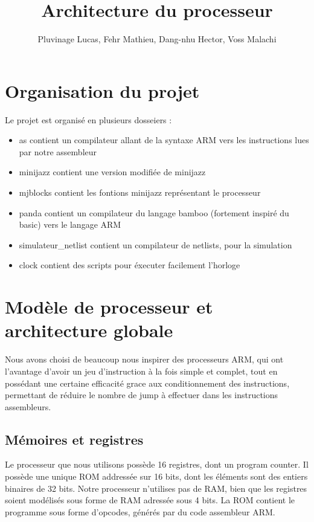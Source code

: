 \documentclass[a4paper]{article}
\title{Architecture du processeur}
\author{Pluvinage Lucas, Fehr Mathieu, Dang-nhu Hector, Voss Malachi}
\begin{document}
\maketitle

\section{Organisation du projet}

Le projet est organisé en plusieurs dosseiers :
\begin{itemize}
  \item as contient un compilateur allant de la syntaxe ARM vers les
    instructions lues par notre assembleur
  \item minijazz contient une version modifiée de minijazz
  \item mjblocks contient les fontions minijazz représentant le processeur
  \item panda contient un compilateur du langage bamboo (fortement inspiré du
    basic) vers le langage ARM
  \item simulateur\_netlist contient un compilateur de netlists, pour la
    simulation
  \item clock contient des scripts pour éxecuter facilement l'horloge 
\end{itemize}

\section{Modèle de processeur et architecture globale}

Nous avons choisi de beaucoup nous inspirer des processeurs ARM, qui ont
l'avantage d'avoir un jeu d'instruction à la fois simple et complet, tout en
possédant une certaine efficacité grace aux conditionnement des instructions,
permettant de réduire le nombre de jump à effectuer dans les instructions
assembleurs.

\subsection{Mémoires et registres}

Le processeur que nous utilisons possède 16 registres, dont un program counter.
Il possède une unique ROM addressée sur 16 bits, dont les éléments sont des
entiers binaires de 32 bits. Notre processeur n'utilises pas de RAM, bien que
les registres soient modélisés sous forme de RAM adressée sous 4 bits.
La ROM contient le programme sous forme d'opcodes, générés par du code
assembleur ARM.
\end{document}
